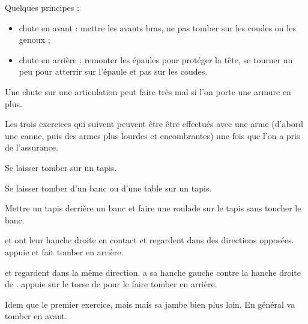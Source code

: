 \noindent
Quelques principes :
\begin{itemize}
	\item chute en avant : mettre les avants bras, ne pas tomber sur les coudes ou les genoux ;
	\item chute en arrière : remonter les épaules pour protéger la tête, se tourner un peu pour atterrir sur l'épaule et pas sur les coudes.
\end{itemize}
Une chute sur une articulation peut faire très mal si l'on porte une armure en plus.


Les trois exercices qui suivent peuvent être être effectués avec une arme (d'abord une canne, puis des armes plus lourdes et encombrantes) une fois que l'on a pris de l'assurance.


\begin{exercice}[Chute]

Se laisser tomber sur un tapis.

\end{exercice}


\begin{exercice}

Se laisser tomber d'un banc ou d'une table sur un tapis.

\end{exercice}


\begin{exercice}
Mettre un tapis derrière un banc et faire une roulade sur le tapis sans toucher le banc.
\end{exercice}


\begin{exercice}
\A et \D ont leur hanche droite en contact et regardent dans des directions opposées.
\A appuie et fait tomber \D en arrière.

\end{exercice}


\begin{exercice}
\A et \D regardent dans la même direction.
\A a sa hanche gauche contre la hanche droite de \D.
\A appuie sur le torse de \D pour le faire tomber en arrière.

\end{exercice}


\begin{exercice}
Idem que le premier exercice, mais \A mais sa jambe bien plus loin.
En général \D va tomber en avant.

\end{exercice}

